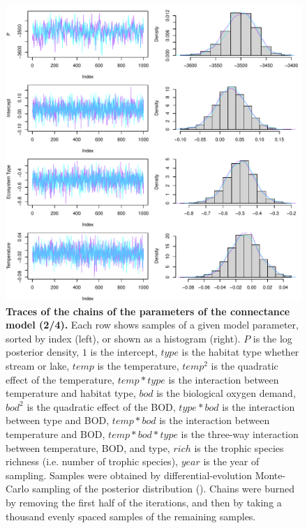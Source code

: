 \documentclass[11pt, oneside]{article}
\begin{document}
\begin{figure}[H]
\begin{center}
\includegraphics[page=2, width=1\linewidth]{scripts/b0_6_3/out_con/fig_tracePlot_beta.pdf}
\caption{
    \textbf{Traces of the chains of the parameters of the connectance model (2/4).}
    Each row shows samples of a given model parameter, sorted by index (left), or shown as a histogram (right).
    $P$ is the log posterior density, $1$ is the intercept, $type$ is the habitat type whether stream or lake, $temp$ is the temperature, $temp^2$ is the quadratic effect of the temperature, $temp * type$ is the interaction between temperature and habitat type, $bod$ is the biological oxygen demand, $bod^2$ is the quadratic effect of the BOD, $type * bod$ is the interaction between type and BOD, $temp * bod$ is the interaction between temperature and BOD, $temp * bod * type$ is the three-way interaction between temperature, BOD, and type, $rich$ is the trophic species richness (i.e. number of trophic species), $year$ is the year of sampling.
    Samples were obtained by differential-evolution Monte-Carlo sampling of the posterior distribution (\cite{TerBraak2006}).
    Chains were burned by removing the first half of the iterations, and then by taking a thousand evenly spaced samples of the remaining samples.
}
\end{center}
\end{figure}
\end{document}
